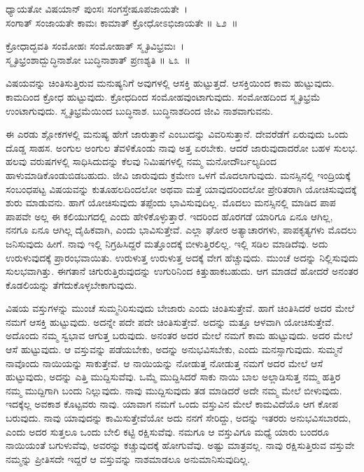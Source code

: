 \begin{shloka}
ಧ್ಯಾಯತೋ ವಿಷಯಾನ್ ಪುಂಸಃ ಸಂಗಸ್ತೇಷೂಪಜಾಯತೇ~।\\ಸಂಗಾತ್ ಸಂಜಾಯತೇ ಕಾಮಃ ಕಾಮಾತ್ ಕ್ರೋಧೋಽಭಿಜಾಯತೇ \hfill॥ ೬೨~॥
\end{shloka}

\begin{shloka}
ಕ್ರೋಧಾದ್ಭವತಿ ಸಂಮೋಹಃ ಸಂಮೋಹಾತ್ ಸ್ಮೃತಿವಿಭ್ರಮಃ~।\\ಸ್ಮೃತಿಭ್ರಂಶಾದ್ಬುದ್ಧಿನಾಶೋ ಬುದ್ಧಿನಾಶಾತ್ ಪ್ರಣಶ್ಯತಿ \hfill॥ ೬೩~॥
\end{shloka}

\begin{artha}
ವಿಷಯವನ್ನು ಚಿಂತಿಸುತ್ತಿರುವ ಮನುಷ್ಯನಿಗೆ ಅವುಗಳಲ್ಲಿ ಆಸಕ್ತಿ ಹುಟ್ಟುತ್ತದೆ. ಆಸಕ್ತಿಯಿಂದ ಕಾಮ ಹುಟ್ಟುವುದು. ಕಾಮದಿಂದ ಕ್ರೋಧ ಹುಟ್ಟುವುದು. ಕ್ರೋಧದಿಂದ ಸಂಮೋಹವುಂಟಾಗುವುದು. ಸಂಮೋಹದಿಂದ ಸ್ಮೃತಿಭ್ರಮೆ ಉಂಟಾಗುವುದು. ಸ್ಮೃತಿಭ್ರಮೆಯಿಂದ ಬುದ್ಧಿನಾಶ. ಬುದ್ಧಿನಾಶದಿಂದ ಜೀವಿ ನಾಶವಾಗುವನು.
\end{artha}

ಈ ಎರಡು ಶ್ಲೋಕಗಳಲ್ಲಿ ಮನುಷ್ಯ ಹೇಗೆ ಜಾರುತ್ತಾನೆ ಎಂಬುದನ್ನು ವಿವರಿಸುತ್ತಾನೆ. ದೇವರೆಡೆಗೆ ಏರುವುದು ಒಂದು ದೊಡ್ಡ ಸಾಹಸ. ಅಂಗುಲ ಅಂಗುಲ ತೆವಳಿಕೊಂಡು ನಾವು ಅತ್ತ ಏರಬೇಕು. ಆದರೆ ಜಾರುವುದಾದರೋ ಬಹಳ ಸುಲಭ. ಹಲವು ವರುಷಗಳಲ್ಲಿ ಸಾಧಿಸಿದುದನ್ನು ಕೆಲವು ನಿಮಿಷಗಳಲ್ಲಿ ನಮ್ಮ ಮನೋದೌರ್ಬಲ್ಯದಿಂದ ಹಾಳುಮಾಡಿಕೊಂಡುಬಿಡಬಹುದು. ಜೀವಿ ಜಾರುವುದು ಕ್ರಮೇಣ ಒಳಗೆ ಮೊದಲಾಗುವುದು. ಮನಸ್ಸಿನಲ್ಲಿ ಇಂದ್ರಿಯಕ್ಕೆ ಸಂಬಂಧಪಟ್ಟ ವಿಷಯವನ್ನು ಕುತೂಹಲದಿಂದಲೋ ಅಥವಾ ಮತ್ತೆ ಯಾವುದರಿಂದಲೋ ಪ್ರೇರಿತರಾಗಿ ಯೋಚಿಸುವುದಕ್ಕೆ ಶುರು ಮಾಡುವನು. ಹಾಗೆ ಯೋಚಿಸುವುದು ತಪ್ಪೆಂದು ಭಾವಿಸುವುದಿಲ್ಲ. ಮೊದಲು ಮನಸ್ಸಿನಲ್ಲಿ ಮಾಡಿದ ಪಾಪ ಪಾಪವೇ ಅಲ್ಲ ಈ ಕಲಿಯುಗದಲ್ಲಿ ಎಂದು ಹೇಳಿಕೊಳ್ಳುತ್ತಾರೆ. ಇದರಿಂದ ಹೊರಗಡೆ ಯಾರಿಗೂ ಏನೂ ಆಗಿಲ್ಲ, ನನಗೂ ಏನೂ ಆಗಿಲ್ಲ ದೈಹಿಕವಾಗಿ, ಎಂದು ಭಾವಿಸುತ್ತೇವೆ. ಎಲ್ಲಾ ಘೋರ ಅತ್ಯಾಚಾರಗಳು, ಪಾಪಕೃತ್ಯಗಳು ಮೊದಲು ಜನಿಸುವುದು ಹೀಗೆ. ನಾವು ಇಲ್ಲಿ ನಿಗ್ರಹಿಸಿದ್ದರೆ ಮತ್ತೊಂದಕ್ಕೆ ಬೀಳುತ್ತಿರಲಿಲ್ಲ. ಇಲ್ಲಿ ಸಡಿಲ ಮಾಡಿದೆವು. ಅದು ಉರುಳುವುದಕ್ಕೆ ಪ್ರಾರಂಭವಾಯಿತು. ಉರುಳುತ್ತ ಉರುಳುತ್ತ ಅದಕ್ಕೆ ವೇಗ ಹೆಚ್ಚುವುದು. ಮುಂಚೆ ಅದನ್ನು ನಿಲ್ಲಿಸುವುದು ಸುಲಭವಾಗಿತ್ತು. ಈಗತಾನೆ ಚಿಗುರುತ್ತಿರುವುದನ್ನು ಉಗುರಿನಿಂದ ಕಿತ್ತುಹಾಕಬಹುದು. ಆಗ ಮಾಡದೆ ಹೋದರೆ ಅನಂತರ ಕೊಡಲಿಯನ್ನು ತೆಗೆದುಕೊಳ್ಳಬೇಕಾಗುವುದು.

ವಿಷಯ ವಸ್ತುಗಳನ್ನು ಮುಂಚೆ ಸುಮ್ಮನಿರಿಸುವುದು ಬೇಜಾರು ಎಂದು ಚಿಂತಿಸುತ್ತೇವೆ. ಹಾಗೆ ಚಿಂತಿಸಿದರೆ ಅದರ ಮೇಲೆ ನಮಗೆ ಆಸಕ್ತಿ ಹುಟ್ಟುವುದು. ಅದನ್ನೇ ಪದೇ ಪದೇ ಚಿಂತಿಸುತ್ತೇವೆ. ಅದನ್ನು ಮತ್ತೂ ಆಳವಾಗಿ ಯೋಚಿಸುತ್ತೇವೆ. ಅದೊಂದು ನಮ್ಮ ಸ್ವಭಾವ ಆಗುತ್ತ ಬರುವುದು. ಅನಂತರ ಅದರ ಮೇಲೆ ನಮಗೆ ಕಾಮ ಹುಟ್ಟುವುದು. ಅದರ ಮೇಲೆ ಆಸೆ ಹುಟ್ಟುವುದು. ಆ ವಸ್ತುವನ್ನು ಪಡೆಯಬೇಕು, ಅದನ್ನು ಅನುಭವಿಸಬೇಕು, ಎಂದು ಮನಸ್ಸಾಗುವುದು. ಸುಮ್ಮನೆ ನಾವೊಂದು ನಾಯಿಯನ್ನು ಸಾಕುತ್ತೇವೆ. ಆ ನಾಯಿಯನ್ನು ನೋಡುತ್ತ ನೋಡುತ್ತ ನಮಗೆ ಅದರ ಮೇಲೆ ಆಸೆ ಹುಟ್ಟುವುದು, ಅದನ್ನು ಎತ್ತಿ ಮುದ್ದಿಸುವೆವು. ಒಮ್ಮೆ ಮುದ್ದಿಸಿದರೆ ಸಾಕು ನಾಯಿ ಬಾಲ ಅಲ್ಲಾಡಿಸುತ್ತ ನಮ್ಮ ಹತ್ತಿರ ನಮ್ಮ ಮುದ್ದಿಗಾಗಿ ಬಂದು ನಿಲ್ಲುವುದು. ನಾವು ಮುದ್ದಿಸುವುದು ತಡ ಮಾಡಿದರೆ ಅದೇ ನಮ್ಮ ಮೇಲೆ ಬೀಳುವುದು. ಇದಕ್ಕೆಲ್ಲ ಅವಕಾಶ ಕೊಟ್ಟವರು ನಾವು. ಯಾವಾಗ ನಮಗೆ ಒಂದು ವಸ್ತುವಿನ ಮೇಲೆ ಕಾಮವಿದೆಯೊ ಆಗ ಕೋಪ ಬರುವುದು. ನಾವು ಯಾವುದನ್ನು ಕಾಮಿಸುತ್ತೇವೆಯೋ ಅದು ನನಗೆ ಸೇರಿದ್ದು, ಅದನ್ನು ಇತರರು ಅನುಭವಿಸಬಾರದು, ಎಂದು ಅದರ ಸುತ್ತಲೂ ಒಂದು ಬೇಲಿ ಕಟ್ಟಿ ರಕ್ಷಿಸುವೆವು. ನಮಗೂ ಆ ವಸ್ತುವಿಗೂ ಮಧ್ಯೆ ಯಾರು ಬಂದರೂ ನಾಯಿಯಂತೆ ಬಗುಳುವೆವು, ಅವರನ್ನು ಕಚ್ಚುವುದಕ್ಕೆ ಹೋಗುವೆವು. ಅಷ್ಟು ಮಾತ್ರವಲ್ಲ. ನಾವು ರಕ್ಷಿಸುತ್ತಿರುವ ವಸ್ತುವೇ ನಮ್ಮನ್ನು ಪ್ರೀತಿಸದೇ ಇದ್ದರೆ ಆ ವಸ್ತುವನ್ನು ನಾಶಮಾಡಲೂ ಅನುಮಾನಿಸುವುದಿಲ್ಲ.

